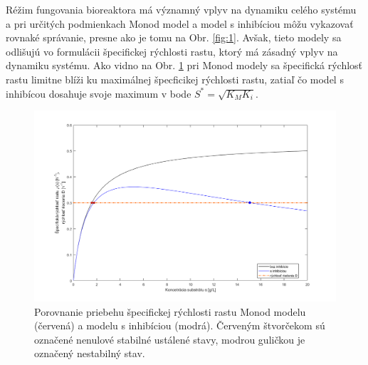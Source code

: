 Réžim fungovania bioreaktora má významný vplyv na dynamiku celého systému a pri určitých podmienkach Monod model a model s inhibíciou môžu vykazovať rovnaké správanie, presne ako je tomu na Obr. \ref{fig:1}. Avšak, tieto modely sa odlišujú vo formulácii špecifickej rýchlosti rastu, ktorý má zásadný vplyv na dynamiku systému. Ako vidno na Obr. \ref{fig:2} pri Monod modely sa špecifická rýchlosť rastu limitne blíži ku maximálnej špecficikej rýchlosti rastu, zatiaľ čo model s inhibícou dosahuje svoje maximum v bode $S^{*} = \sqrt{K_M K_i}$. 

\begin{figure}[H]
	\centering
	\includegraphics[width=1\linewidth]{images/spec_grow_rate_comparison}
	\caption[]{Porovnanie priebehu špecifickej rýchlosti rastu Monod modelu (červená) a modelu s inhibíciou (modrá). Červeným štvorčekom sú označené nenulové stabilné ustálené stavy, modrou guličkou je označený nestabilný stav.}
	\label{fig:2}
\end{figure}

